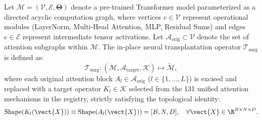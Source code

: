 Let $\mathcal{M} = (\mathcal{V}, \mathcal{E}, \bm{\Theta})$ denote a pre-trained Transformer model parameterized as a directed acyclic computation graph, where vertices $v \in \mathcal{V}$ represent operational modules (LayerNorm, Multi-Head Attention, MLP, Residual Sums) and edges $e \in \mathcal{E}$ represent intermediate tensor activations. Let $\mathcal{A}_{\text{orig}} \subset \mathcal{V}$ denote the set of attention subgraphs within $\mathcal{M}$. The in-place neural transplantation operator $\mathcal{T}_{\text{surg}}$ is defined as:
\begin{equation}
\label{eq:surgery_operator}
\mathcal{T}_{\text{surg}}: (\mathcal{M}, \mathcal{A}_{\text{target}}, \mathcal{K}) \longmapsto \widetilde{\mathcal{M}},
\end{equation}
where each original attention block $A_l \in \mathcal{A}_{\text{orig}}$ ($l \in \{1, \dots, L\}$) is excised and replaced with a target operator $K_l \in \mathcal{K}$ selected from the 131 unified attention mechanisms in the \neuralops{} registry, strictly satisfying the topological identity:
\begin{equation}
\operatorname{Shape}(K_l(\vect{X})) \equiv \operatorname{Shape}(A_l(\vect{X})) = [B, N, D], \quad \forall \vect{X} \in \R^{B \times N \times D}.
\end{equation}

